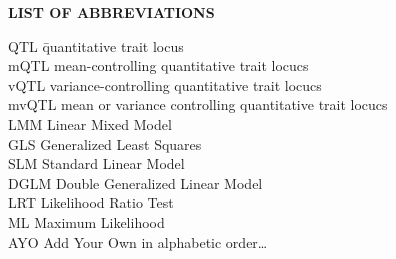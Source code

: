 {}

\begin{center}
{\Large \textbf{LIST OF ABBREVIATIONS}}
\end{center}

\newcommand{\Ab}[2]{\noindent  #1 \> #2 \\}
\newcommand{\Abi}[2]{\noindent #1 \hspace{1.5cm} \= #2 \\}

\begin{tabbing}
\Abi{QTL}{quantitative trait locus}
\Ab{mQTL}{mean-controlling quantitative trait locucs}
\Ab{vQTL}{variance-controlling quantitative trait locucs}
\Ab{mvQTL}{mean or variance controlling quantitative trait locucs}
\Ab{LMM}{Linear Mixed Model}
\Ab{GLS}{Generalized Least Squares}
\Ab{SLM}{Standard Linear Model}
\Ab{DGLM}{Double Generalized Linear Model}
\Ab{LRT}{Likelihood Ratio Test}
\Ab{ML}{Maximum Likelihood}
\Ab{AYO}{Add Your Own in alphabetic order\ldots}
\end{tabbing}

\clearpage
